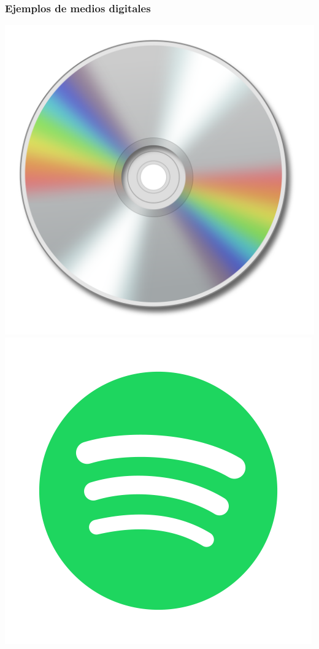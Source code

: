 \documentclass{beamer}
\begin{document}
\begin{frame}
    \frametitle{Ejemplos de medios digitales}
    \centering
    \includegraphics[scale=0.05]{cd}
    \includegraphics[scale=0.2]{spotify}


\end{frame}
\end{document}
